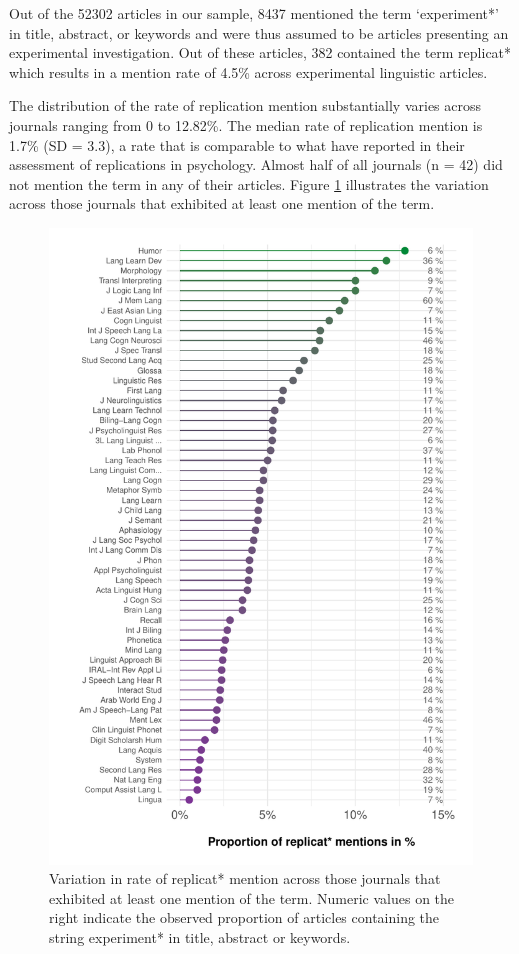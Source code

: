 \documentclass[cm,linguex]{glossa}
\begin{document}
Out of the 52302 articles in our sample, 8437 mentioned the term `experiment*' in title, abstract, or keywords and were thus assumed to be articles presenting an experimental investigation.
Out of these articles, 382 contained the term replicat* which results in a mention rate of 4.5\% across experimental linguistic articles.

The distribution of the rate of replication mention substantially varies across journals ranging from 0 to 12.82\%. The median rate of replication mention is 1.7\% (SD = 3.3), a rate that is comparable to what \citet{makel_replications_2012} have reported in their assessment of replications in psychology.
Almost half of all journals (n = 42) did not mention the term in any of their articles.
Figure \ref{fig:topten-plot} illustrates the variation across those journals that exhibited at least one mention of the term.

\begin{figure}

{\centering \includegraphics{AnonymizedReplicationLing_files/figure-latex/topten-plot-1} 

}

\caption{Variation in rate of replicat* mention across those journals that exhibited at least one mention of the term. Numeric values on the right indicate the observed proportion of articles containing the string experiment* in title, abstract or keywords.}\label{fig:topten-plot}
\end{figure}
\end{document}
